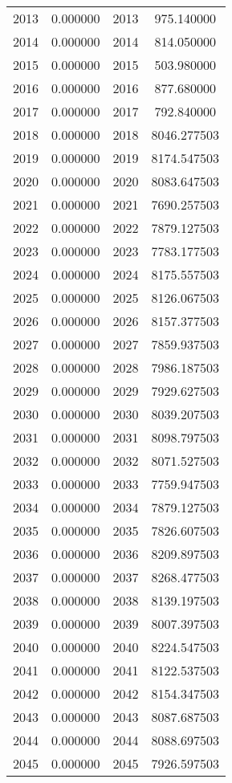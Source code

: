 \documentclass[12pt]{article}
\begin{document}
\begin{longtable}{@{}cccc@{}}
2013 & 0.000000 & 2013 & 975.140000 \\
2014 & 0.000000 & 2014 & 814.050000 \\
2015 & 0.000000 & 2015 & 503.980000 \\
2016 & 0.000000 & 2016 & 877.680000 \\
2017 & 0.000000 & 2017 & 792.840000 \\
2018 & 0.000000 & 2018 & 8046.277503 \\
2019 & 0.000000 & 2019 & 8174.547503 \\
2020 & 0.000000 & 2020 & 8083.647503 \\
2021 & 0.000000 & 2021 & 7690.257503 \\
2022 & 0.000000 & 2022 & 7879.127503 \\
2023 & 0.000000 & 2023 & 7783.177503 \\
2024 & 0.000000 & 2024 & 8175.557503 \\
2025 & 0.000000 & 2025 & 8126.067503 \\
2026 & 0.000000 & 2026 & 8157.377503 \\
2027 & 0.000000 & 2027 & 7859.937503 \\
2028 & 0.000000 & 2028 & 7986.187503 \\
2029 & 0.000000 & 2029 & 7929.627503 \\
2030 & 0.000000 & 2030 & 8039.207503 \\
2031 & 0.000000 & 2031 & 8098.797503 \\
2032 & 0.000000 & 2032 & 8071.527503 \\
2033 & 0.000000 & 2033 & 7759.947503 \\
2034 & 0.000000 & 2034 & 7879.127503 \\
2035 & 0.000000 & 2035 & 7826.607503 \\
2036 & 0.000000 & 2036 & 8209.897503 \\
2037 & 0.000000 & 2037 & 8268.477503 \\
2038 & 0.000000 & 2038 & 8139.197503 \\
2039 & 0.000000 & 2039 & 8007.397503 \\
2040 & 0.000000 & 2040 & 8224.547503 \\
2041 & 0.000000 & 2041 & 8122.537503 \\
2042 & 0.000000 & 2042 & 8154.347503 \\
2043 & 0.000000 & 2043 & 8087.687503 \\
2044 & 0.000000 & 2044 & 8088.697503 \\
2045 & 0.000000 & 2045 & 7926.597503 \\

\end{longtable}
\end{document}
